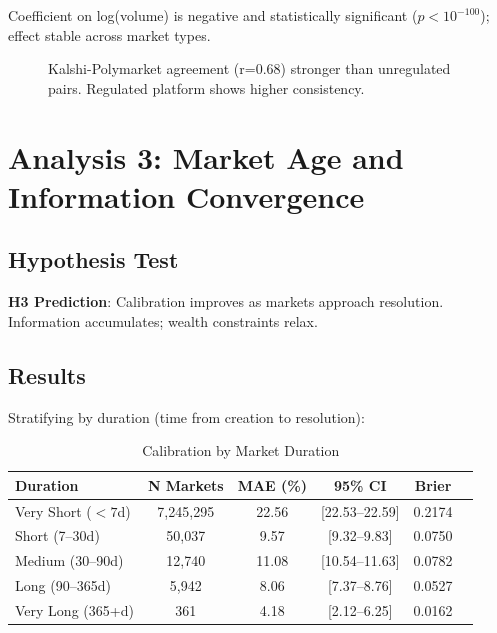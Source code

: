 \documentclass[a4paper,11pt]{article}
\theoremstyle{plain}
\theoremstyle{definition}
\begin{document}
Coefficient on log(volume) is negative and statistically significant ($p < 10^{-100}$); effect stable across market types.

\begin{figure}[h]
\centering
\small
{}
\caption{Kalshi-Polymarket agreement (r=0.68) stronger than unregulated pairs. Regulated platform shows higher consistency.}
\label{fig:xplatform}
\end{figure}

\section{Analysis 3: Market Age and Information Convergence}
\label{sec:analysis3}

\subsection{Hypothesis Test}

\textbf{H3 Prediction}: Calibration improves as markets approach resolution. Information accumulates; wealth constraints relax.

\subsection{Results}

Stratifying by duration (time from creation to resolution):

\begin{table}[h]
\centering
\small
\begin{tabular}{lccccc}
\toprule
\textbf{Duration} & \textbf{N Markets} & \textbf{MAE (\%)} & \textbf{95\% CI} & \textbf{Brier} \\
\midrule
Very Short ($<7$d) & 7,245,295 & 22.56 & [22.53--22.59] & 0.2174 \\
Short (7--30d) & 50,037 & 9.57 & [9.32--9.83] & 0.0750 \\
Medium (30--90d) & 12,740 & 11.08 & [10.54--11.63] & 0.0782 \\
Long (90--365d) & 5,942 & 8.06 & [7.37--8.76] & 0.0527 \\
Very Long (365+d) & 361 & 4.18 & [2.12--6.25] & 0.0162 \\
\bottomrule
\end{tabular}
\caption{Calibration by Market Duration}
\label{tab:age}
\end{table}
\end{document}
